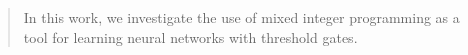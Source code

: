 \begin{abstract}
In this work, we investigate the use of mixed integer programming as a tool for learning neural networks with threshold gates. 
\end{abstract}
